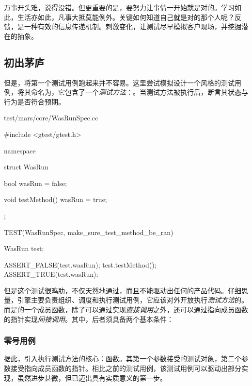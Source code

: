 \begin{content}

万事开头难，说得没错。但更重要的是，要努力让事情一开始就是对的。学习如此，生活亦如此，凡事大抵莫能例外。关键如何知道自己就是对的那个人呢？反馈，是一种有效的信息传递机制。刺激变化，让测试尽早模拟客户现场，并挖掘潜在的抽象。

\subsection{初出茅庐}

但是，将第一个测试用例跑起来并不容易。这里尝试模拟设计一个风格的测试用例，将其命名为，它包含了一个\emph{测试方法}：。当测试方法被执行后，断言其状态与行为是否符合预期。

\begin{nodiff}{test/mars/core/WasRunSpec.cc}
\begin{c++}
#include <gtest/gtest.h>

namespace {
  struct WasRun {
    bool wasRun = false;

    void testMethod() {
      wasRun = true;
    }
  };
}

TEST(WasRunSpec, make_sure_test_method_be_ran) {
  WasRun test;

  ASSERT_FALSE(test.wasRun);
  test.testMethod();
  ASSERT_TRUE(test.wasRun);
}
\end{c++}
\end{nodiff}

但是这个测试很鸡肋，不仅天然地通过，而且不能驱动出任何的产品代码。仔细思量，引擎主要负责组织、调度和执行测试用例，它应该对外开放执行\emph{测试方法}的。而是的一个成员函数，除了可以通过实现\emph{直接调用}之外，还可以通过指向成员函数的指针实现\emph{间接调用}。其中，后者须具备两个基本条件：

\begin{enum}
\end{enum}

\subsubsection{零号用例}

据此，引入执行测试方法的核心：函数。其第一个参数接受的测试对象，第二个参数接受指向成员函数的指针。相比之前的测试用例，该测试用例可以驱动出部分实现，虽然进步甚微，但已迈出具有实质意义的第一步。


\end{content}
